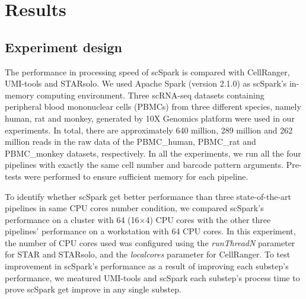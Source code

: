 \documentclass[conference]{IEEEtran}
\begin{document}


\section{Results}

\subsection{Experiment design}
The performance in processing speed of scSpark is compared with CellRanger, UMI-tools and STARsolo. 
We used Apache Spark (version 2.1.0) as scSpark's in-memory computing environment. 
Three scRNA-seq datasets containing peripheral blood mononuclear cells (PBMCs) from three different species, namely human, rat and monkey, generated by 10X Genomics platform were used in our experiments. 
In total, there are approximately 640 million, 289 million and 262 million reads in the raw data of the PBMC\_human, PBMC\_rat and PBMC\_monkey datasets, respectively. 
In all the experiments, we run all the four pipelines with exactly the same cell number and barcode pattern arguments. Pre-tests were performed to ensure sufficient memory for each pipeline.

To identify whether scSpark get better performance than three state-of-the-art pipelines in same CPU cores number condition,
we compared scSpark's performance on a cluster with 64 (16$\times$4) CPU cores with the other three pipelines' performance on a workstation with 64 CPU cores.
In this experiment, the number of CPU cores used was configured using the \textit{runThreadN} parameter for STAR and STARsolo, and the \textit{localcores} parameter for CellRanger. 
To test improvement in scSpark's performance as a result of improving each substep's performance,
we meatured UMI-tools and scSpark each substep's process time to prove scSpark get improve in any single substep.
\end{document}
